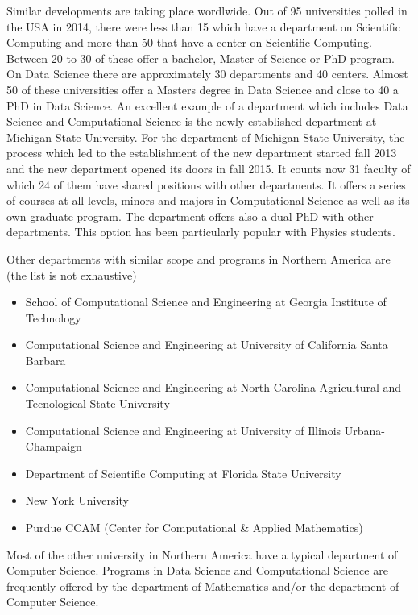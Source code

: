 \documentclass[a4paper,10pt]{article}
\begin{document}
Similar developments are taking place wordlwide. 
Out of 95 universities polled in the USA in 2014, there were less than 15 which have a department on Scientific Computing and more than 50 that have a center on Scientific Computing. Between 20 to 30 of these offer a bachelor, Master of Science or PhD program. On Data Science there are approximately 30 departments and 40 centers. Almost 50 of these universities offer a Masters degree in Data Science and close to 40 a PhD in Data Science.  An excellent example of a department which includes Data Science and Computational Science is the newly established department at Michigan State University.
For the department of Michigan State University, the process which led to the establishment of the new department started fall 2013 and the new department opened its doors in fall 2015. It counts now 31 faculty of which 24 of them have shared positions with other departments. It offers a series of courses at all levels, minors and majors in Computational Science as well as its own graduate program. The department offers also a dual PhD with other departments. This option has been particularly popular with Physics students.

Other departments with similar scope and programs in Northern America are (the list is not exhaustive)
\begin{itemize}
\item School of Computational Science and Engineering at Georgia Institute of Technology
\item Computational Science and Engineering at University of California Santa Barbara
\item Computational Science and Engineering at North Carolina Agricultural and Tecnological State University
\item Computational Science and Engineering at University of Illinois Urbana-Champaign
\item Department of Scientific Computing at Florida State University
\item New York University
\item Purdue CCAM (Center for Computational \& Applied Mathematics)
\end{itemize}
Most of the other university in Northern America have a typical department of Computer Science. Programs in Data Science and Computational Science are frequently offered by the department of Mathematics and/or the department of Computer Science.
\end{document}
